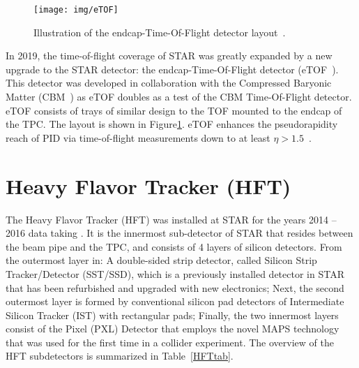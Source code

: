 \begin{figure}[!htb]
\begin{center}
 \texttt{[image: img/eTOF]}\\
\end{center}
\caption{\label{eTOF}Illustration of the endcap-Time-Of-Flight detector layout~\cite{eTOF}. }
\end{figure}

In 2019, the time-of-flight coverage of STAR was greatly expanded by a new upgrade to the STAR detector: the endcap-Time-Of-Flight detector (eTOF~\cite{eTOF})\@. This detector was developed in collaboration with the Compressed Baryonic Matter (CBM~\cite{CBM}) as eTOF doubles as a test of the CBM Time-Of-Flight detector. eTOF consists of trays of similar design to the TOF mounted to the endcap of the TPC\@. The layout is shown in Figure\ref{eTOF}\@. eTOF enhances the pseudorapidity reach of PID via time-of-flight measurements down to at least $\eta > 1.5$~\cite{eTOF_LOI}\@.


\section{Heavy Flavor Tracker (HFT)\label{HFTsection}} 

The Heavy Flavor Tracker (HFT) was installed at STAR for the years 2014 -- 2016 data 
taking \cite{HftTdr, HFTLeo, HftFinal}. It is the innermost 
sub-detector of STAR that resides between the beam pipe and the TPC, and consists of 4
layers of silicon detectors. From the outermost layer in: A double-sided strip detector, called Silicon Strip
Tracker/Detector
(SST/SSD), which is a previously installed detector in STAR that has been
refurbished and upgraded with new electronics; Next, the second outermost layer is formed by conventional silicon 
pad detectors
of Intermediate Silicon Tracker (IST) 
with rectangular pads; Finally, the two innermost layers consist of the Pixel (PXL) 
Detector
that employs the novel MAPS technology that was used for the first time in a collider experiment. The overview of the 
HFT
subdetectors is summarized in Table~\ref{HFTtab}.

